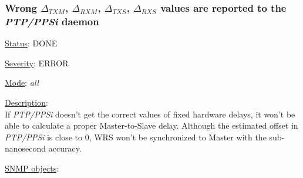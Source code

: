 \subsubsection{\bf Wrong $\Delta_{TXM}$, $\Delta_{RXM}$, $\Delta_{TXS}$,
		$\Delta_{RXS}$ values are reported to the \emph{PTP/PPSi} daemon}
		\label{fail:timing:deltas_report}
		\begin{pck_descr}
			\item [] \underline{Status}: DONE
			\item [] \underline{Severity}: ERROR
			\item [] \underline{Mode}: \emph{all}
			\item [] \underline{Description}:\\
				If \emph{PTP/PPSi} doesn't get the correct values of fixed hardware delays,
				it won't be able to calculate a proper Master-to-Slave delay. Although
				the estimated offset in \emph{PTP/PPSi} is close to 0, WRS won't be
				synchronized to Master with the sub-nanosecond accuracy.
			\item [] \underline{SNMP objects}:\\
				\\
				\\
				\\
				\\
				\\
				 \\
		\end{pck_descr}


